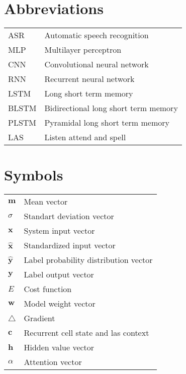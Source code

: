 \documentclass[master=ewit,english]{kulemt}
\begin{document}
\section*{Abbreviations}
\begin{flushleft}
  \renewcommand{\arraystretch}{1.1}
  \begin{tabularx}{\textwidth}{@{}p{12mm}X@{}}
    ASR   & Automatic speech recognition \\
    MLP	  & Multilayer perceptron \\
    CNN   & Convolutional neural network \\
    RNN   & Recurrent neural network \\
    LSTM  & Long short term memory \\
    BLSTM & Bidirectional long short term memory \\
    PLSTM & Pyramidal long short term memory \\
    LAS	  & Listen attend and spell \\
  \end{tabularx}
\end{flushleft}
\section*{Symbols}
\begin{flushleft}
  \renewcommand{\arraystretch}{1.1}
  \begin{tabularx}{\textwidth}{@{}p{12mm}X@{}}
	$\mathbf{m}$ & Mean vector \\
	$\sigma$	 & Standart deviation vector \\
	$\mathbf{x}$ & System input vector \\
	$\hat{\mathbf{x}}$ & Standardized input vector \\
	$\hat{\mathbf{y}}$ & Label probability distribution vector \\
	$\mathbf{y}$ & Label output vector \\
	$E$			 & Cost function \\
	$\mathbf{w}$ & Model weight vector \\
	$\triangle$	 & Gradient \\
	$\mathbf{c}$  & Recurrent cell state and las context \\
	$\mathbf{h}$  & Hidden value vector \\
	$\alpha$	 & Attention vector \\
  \end{tabularx}
\end{flushleft}
\end{document}
